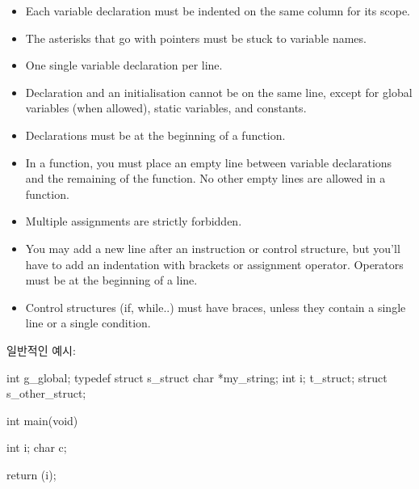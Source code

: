 \documentclass{42-ko}
\begin{document}
\begin{itemize}
                \item Each variable declaration must be indented on the same
                  column for its scope.

                \item The asterisks that go with pointers must be stuck to
                  variable names.

                \item One single variable declaration per line.

                \item Declaration and an initialisation cannot be
                  on the same line, except for global variables (when allowed),
                  static variables, and constants.

                \item Declarations must be at the beginning of a function.

                \item In a function, you must place an empty line between 
                    variable declarations and the remaining of the function.
                    No other empty lines are allowed in a function.

                \item Multiple assignments are strictly forbidden.

                \item You may add a new line after an instruction or
                  control structure, but you'll have to add an
                  indentation with brackets or assignment operator.
                  Operators must be at the beginning of a line.

                \item Control structures (if, while..) must have braces, unless they contain a single 
                    line or a single condition.

            \end{itemize}

            \newpage

            일반적인 예시:
            \begin{42ccode}
int             g_global;
typedef struct  s_struct
{
    char    *my_string;
    int     i;
}               t_struct;
struct          s_other_struct;

int     main(void)
{
    int     i;
    char    c;

    return (i);
}
            \end{42ccode}
            \newpage
\end{document}
